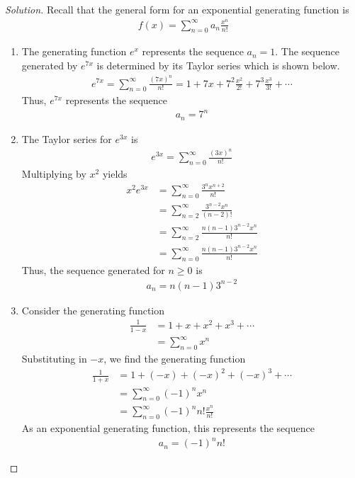 \documentclass[12pt]{article}
\theoremstyle{definition}
\newenvironment{solution}{
  \begin{proof}[Solution]
    \vspace{-8px}
    \setlength{\parskip}{4px}
    \setlength{\parindent}{0px}
}{
\end{proof}
}
\begin{document}
  \begin{solution}
    Recall that the general form for an exponential generating function is
    \begin{align*}
      f(x) = \sum_{n = 0}^{\infty} a_{n} \frac{x^n}{n!}
    \end{align*}
    \begin{enumerate}[label={\alph*.}]
      \item The generating function \(e^x\) represents the sequence \(a_{n} = 1\). The sequence generated by \(e^{7x}\) is determined by its Taylor series which is shown below.
      \begin{align*}
        e^{7x} = \sum_{n=0}^{\infty} \frac{(7x)^{n}}{n!} = 1 + 7x + 7^2 \frac{x^2}{2!} + 7^3 \frac{x^3}{3!} + \cdots
      \end{align*}
      Thus, \(e^{7x}\) represents the sequence
      \begin{align*}
        a_{n} = 7^{n}
      \end{align*}

      \item The Taylor series for \(e^{3x}\) is
      \begin{align*}
        e^{3x} = \sum_{n = 0}^{\infty} \frac{(3x)^n}{n!}
      \end{align*}
      Multiplying by \(x^2\) yields
      \begin{align*}
        x^{2} e^{3x} &= \sum_{n = 0}^{\infty} \frac{3^n x^{n+2}}{n!} \\
        &= \sum_{n = 2}^{\infty} \frac{3^{n - 2} x^n}{(n - 2)!} \\
        &= \sum_{n = 2}^{\infty} \frac{n (n - 1) 3^{n-2} x^{n}}{n!} \\
        &= \sum_{n = 0}^{\infty} \frac{n (n - 1) 3^{n-2} x^{n}}{n!}
      \end{align*}
      Thus, the sequence generated for \(n \geq 0\) is
      \begin{align*}
        a_{n} = n (n - 1) 3^{n - 2}
      \end{align*}

      \item Consider the generating function
      \begin{align*}
        \frac{1}{1 - x} &= 1 + x + x^2 + x^3 + \cdots \\
        &= \sum_{n=0}^{\infty} x^n
      \end{align*}
      Substituting in \(-x\), we find the generating function
      \begin{align*}
        \frac{1}{1 + x} &= 1 + (-x) + (-x)^2 + (-x)^3 + \cdots \\
        &= \sum_{n=0}^{\infty} (-1)^n x^n \\
        &= \sum_{n=0}^{\infty} (-1)^n n! \frac{x^n}{n!}
      \end{align*}
      As an exponential generating function, this represents the sequence
      \begin{align*}
        a_n = (-1)^n n!
      \end{align*}


\end{enumerate}
\end{solution}
\end{document}
